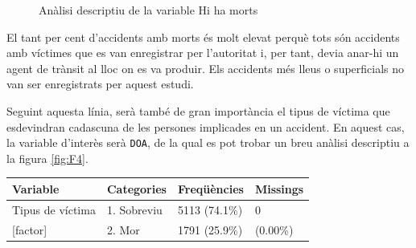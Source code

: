 \documentclass[12pt,longbibliography]{article}
\theoremstyle{definition}
\theoremstyle{remark}
\begin{document}
\begin{figure}[h!]
\par
{}%
\hfill
{}%
\par

\caption{Anàlisi descriptiu de la variable Hi ha morts}
\label{fig:F3}
\end{figure}

El tant per cent d'accidents amb morts és molt elevat perquè tots són accidents amb víctimes que es van enregistrar per l'autoritat i, per tant, devia anar-hi un agent de trànsit al lloc on es va produir. Els accidents més lleus o superficials no van ser enregistrats per aquest estudi.


Seguint aquesta línia, serà també de gran importància el tipus de víctima que esdevindran cadascuna de les persones implicades en un accident. En aquest cas, la variable d'interès serà \texttt{DOA}, de la qual es pot trobar un breu anàlisi descriptiu a la figura \ref{fig:F4}.

\begin{table}[H]
\centering
\begin{tabular}{llll}
\hline
Variable         & Categories  & Freqüències   & Missings \\ \hline
Tipus de víctima & 1. Sobreviu & 5113 (74.1\%) & 0        \\
{[}factor{]}     & 2. Mor      & 1791 (25.9\%) & (0.00\%) \\ \hline
\end{tabular}
\end{table}
\end{document}
